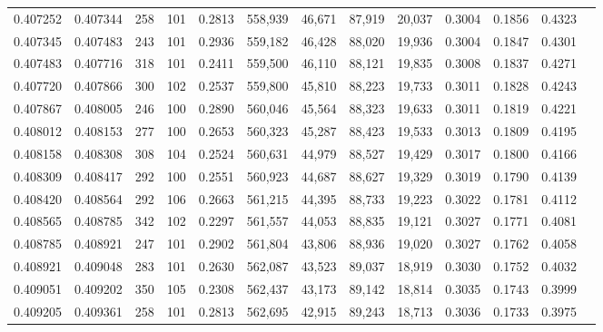 \begin{tabular}{rrrrrrrrrrrrr}
0.407252 & 0.407344 &   258 & 101 &                                     0.2813 & 558,939 &  46,671 &  87,919 &  20,037 & 0.3004 & 0.1856 & 0.4323 \\
0.407345 & 0.407483 &   243 & 101 &                                     0.2936 & 559,182 &  46,428 &  88,020 &  19,936 & 0.3004 & 0.1847 & 0.4301 \\
0.407483 & 0.407716 &   318 & 101 &                                     0.2411 & 559,500 &  46,110 &  88,121 &  19,835 & 0.3008 & 0.1837 & 0.4271 \\
0.407720 & 0.407866 &   300 & 102 &                                     0.2537 & 559,800 &  45,810 &  88,223 &  19,733 & 0.3011 & 0.1828 & 0.4243 \\
0.407867 & 0.408005 &   246 & 100 &                                     0.2890 & 560,046 &  45,564 &  88,323 &  19,633 & 0.3011 & 0.1819 & 0.4221 \\
0.408012 & 0.408153 &   277 & 100 &                                     0.2653 & 560,323 &  45,287 &  88,423 &  19,533 & 0.3013 & 0.1809 & 0.4195 \\
0.408158 & 0.408308 &   308 & 104 &                                     0.2524 & 560,631 &  44,979 &  88,527 &  19,429 & 0.3017 & 0.1800 & 0.4166 \\
0.408309 & 0.408417 &   292 & 100 &                                     0.2551 & 560,923 &  44,687 &  88,627 &  19,329 & 0.3019 & 0.1790 & 0.4139 \\
0.408420 & 0.408564 &   292 & 106 &                                     0.2663 & 561,215 &  44,395 &  88,733 &  19,223 & 0.3022 & 0.1781 & 0.4112 \\
0.408565 & 0.408785 &   342 & 102 &                                     0.2297 & 561,557 &  44,053 &  88,835 &  19,121 & 0.3027 & 0.1771 & 0.4081 \\
0.408785 & 0.408921 &   247 & 101 &                                     0.2902 & 561,804 &  43,806 &  88,936 &  19,020 & 0.3027 & 0.1762 & 0.4058 \\
0.408921 & 0.409048 &   283 & 101 &                                     0.2630 & 562,087 &  43,523 &  89,037 &  18,919 & 0.3030 & 0.1752 & 0.4032 \\
0.409051 & 0.409202 &   350 & 105 &                                     0.2308 & 562,437 &  43,173 &  89,142 &  18,814 & 0.3035 & 0.1743 & 0.3999 \\
0.409205 & 0.409361 &   258 & 101 &                                     0.2813 & 562,695 &  42,915 &  89,243 &  18,713 & 0.3036 & 0.1733 & 0.3975 \\

\end{tabular}
